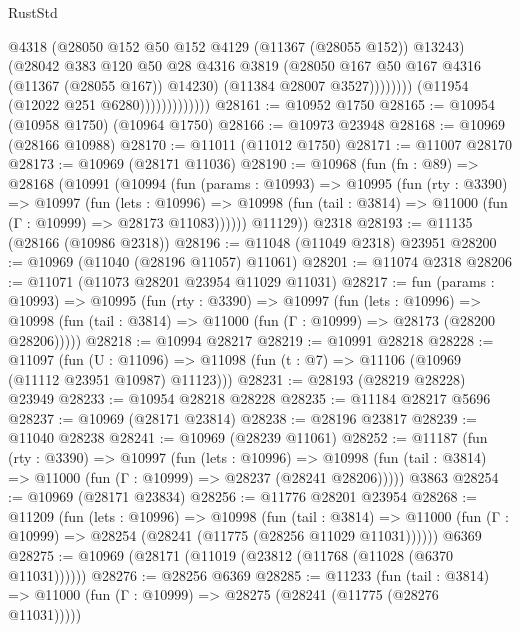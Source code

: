 \begin{lexlean}{RustStd}
\begin{coremodule}
                                      @4318
                                      (@28050 @152 @50 @152 @4129 (@11367 (@28055 @152)) @13243)
                                      (@28042
                                        @383
                                        @120
                                        @50
                                        @28
                                        @4316
                                        @3819
                                        (@28050 @167 @50 @167 @4316 (@11367 (@28055 @167)) @14230)
                                        (@11384 @28007 @3527))))))))
                          (@11954 (@12022 @251 @6280)))))))))))))
@28161 := @10952 @1750
@28165 := @10954 (@10958 @1750) (@10964 @1750)
@28166 := @10973 @23948
@28168 := @10969 (@28166 @10988)
@28170 := @11011 (@11012 @1750)
@28171 := @11007 @28170
@28173 := @10969 (@28171 @11036)
@28190 := @10968
    (fun (fn : @89) =>
    @28168
      (@10991
        (@10994
          (fun (params : @10993) =>
          @10995
            (fun (rty : @3390) =>
            @10997
              (fun (lets : @10996) =>
              @10998 (fun (tail : @3814) => @11000 (fun (Γ : @10999) => @28173 @11083))))))
        @11129))
    @2318
@28193 := @11135 (@28166 (@10986 @2318))
@28196 := @11048 (@11049 @2318) @23951
@28200 := @10969 (@11040 (@28196 @11057) @11061)
@28201 := @11074 @2318
@28206 := @11071 (@11073 @28201 @23954 @11029 @11031)
@28217 := fun (params : @10993) =>
  @10995
    (fun (rty : @3390) =>
    @10997
      (fun (lets : @10996) =>
      @10998 (fun (tail : @3814) => @11000 (fun (Γ : @10999) => @28173 (@28200 @28206)))))
@28218 := @10994 @28217
@28219 := @10991 @28218
@28228 := @11097
    (fun (U : @11096) => @11098 (fun (t : @7) => @11106 (@10969 (@11112 @23951 @10987) @11123)))
@28231 := @28193 (@28219 @28228) @23949
@28233 := @10954 @28218 @28228
@28235 := @11184 @28217 @5696
@28237 := @10969 (@28171 @23814)
@28238 := @28196 @23817
@28239 := @11040 @28238
@28241 := @10969 (@28239 @11061)
@28252 := @11187
    (fun (rty : @3390) =>
    @10997
      (fun (lets : @10996) =>
      @10998 (fun (tail : @3814) => @11000 (fun (Γ : @10999) => @28237 (@28241 @28206)))))
    @3863
@28254 := @10969 (@28171 @23834)
@28256 := @11776 @28201 @23954
@28268 := @11209
    (fun (lets : @10996) =>
    @10998
      (fun (tail : @3814) =>
      @11000 (fun (Γ : @10999) => @28254 (@28241 (@11775 (@28256 @11029 @11031))))))
    @6369
@28275 := @10969 (@28171 (@11019 (@23812 (@11768 (@11028 (@6370 @11031))))))
@28276 := @28256 @6369
@28285 := @11233
    (fun (tail : @3814) => @11000 (fun (Γ : @10999) => @28275 (@28241 (@11775 (@28276 @11031)))))

\end{coremodule}
\end{lexlean}
